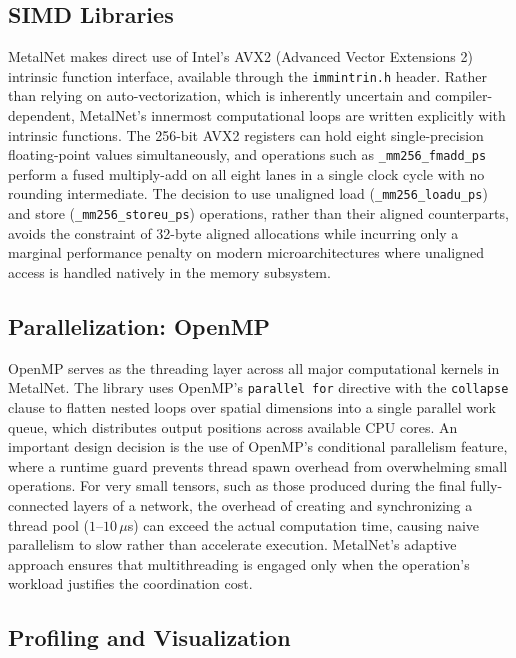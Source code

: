 \documentclass[12pt,oneside,a4paper]{report}
\begin{document}
\subsection{SIMD Libraries}

MetalNet makes direct use of Intel's AVX2 (Advanced Vector Extensions 2) intrinsic function interface, available through the \texttt{immintrin.h} header. Rather than relying on auto-vectorization, which is inherently uncertain and compiler-dependent, MetalNet's innermost computational loops are written explicitly with intrinsic functions. The 256-bit AVX2 registers can hold eight single-precision floating-point values simultaneously, and operations such as \texttt{\_mm256\_fmadd\_ps} perform a fused multiply-add on all eight lanes in a single clock cycle with no rounding intermediate. The decision to use unaligned load (\texttt{\_mm256\_loadu\_ps}) and store (\texttt{\_mm256\_storeu\_ps}) operations, rather than their aligned counterparts, avoids the constraint of 32-byte aligned allocations while incurring only a marginal performance penalty on modern microarchitectures where unaligned access is handled natively in the memory subsystem.

\subsection{Parallelization: OpenMP}

OpenMP serves as the threading layer across all major computational kernels in MetalNet. The library uses OpenMP's \texttt{parallel for} directive with the \texttt{collapse} clause to flatten nested loops over spatial dimensions into a single parallel work queue, which distributes output positions across available CPU cores. An important design decision is the use of OpenMP's conditional parallelism feature, where a runtime guard prevents thread spawn overhead from overwhelming small operations. For very small tensors, such as those produced during the final fully-connected layers of a network, the overhead of creating and synchronizing a thread pool ($1$–$10\,\mu$s) can exceed the actual computation time, causing naive parallelism to slow rather than accelerate execution. MetalNet's adaptive approach ensures that multithreading is engaged only when the operation's workload justifies the coordination cost.

\subsection{Profiling and Visualization}
\end{document}
